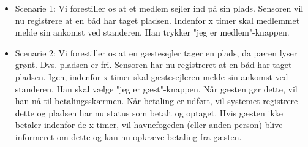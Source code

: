 \begin{itemize}
  \item Scenarie 1: Vi forestiller os at et medlem sejler ind på sin plads. Sensoren vil nu registrere at en båd har taget pladsen. Indenfor x timer skal medlemmet melde sin ankomst ved standeren. Han trykker "jeg er medlem"-knappen. 
  \item Scenarie 2: Vi forestiller os at en gæstesejler tager en plads, da pæren lyser grønt. Dvs. pladsen er fri. Sensoren har nu registreret at en båd har taget pladsen. Igen, indenfor x timer skal gæstesejleren melde sin ankomst ved standeren. Han skal vælge "jeg er gæst"-knappen. Når gæsten gør dette, vil han nå til betalingsskærmen. Når betaling er udført, vil systemet registrere dette og pladsen har nu status som betalt og optaget. Hvis gæsten ikke betaler indenfor de x timer, vil havnefogeden (eller anden person) blive informeret om dette og kan nu opkræve betaling fra gæsten. 
\end{itemize}

